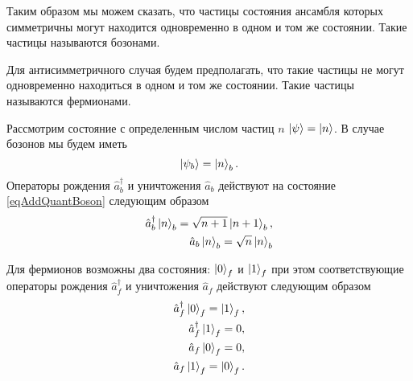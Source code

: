 Таким образом мы можем сказать, что частицы
состояния ансамбля которых симметричны могут находится одновременно в
одном и том же состоянии. Такие частицы называются бозонами.

Для антисимметричного случая будем  
предполагать, что такие частицы не могут одновременно находиться в
одном и том же состоянии. Такие частицы называются фермионами.

Рассмотрим состояние с определенным числом частиц $n$
$\left|\psi\right> = \ket{n}$. В случае бозонов 
мы будем иметь 
\begin{equation}
\left|\psi_b\right> = \ket{n}_b.
\label{eqAddQuantBoson}
\end{equation}
Операторы рождения $\hat{a}_b^{\dag}$ и уничтожения $\hat{a}_b$ действуют на
состояние \eqref{eqAddQuantBoson} следующим образом
\begin{eqnarray}
\hat{a}_b^{\dag}\ket{n}_b = \sqrt{n+1}\ket{n+1}_b, 
\nonumber \\
\hat{a}_b\ket{n}_b = \sqrt{n}\ket{n}_b
\nonumber
\end{eqnarray}

Для фермионов  возможны два состояния: $\ket{0}_f$ и
$\ket{1}_f$ при этом соответствующие операторы рождения
$\hat{a}_f^{\dag}$ и уничтожения $\hat{a}_f$ действуют следующим образом
\begin{eqnarray}
\hat{a}_f^{\dag}\ket{0}_f = \ket{1}_f, 
\nonumber \\
\hat{a}_f^{\dag}\ket{1}_f = 0, 
\nonumber \\
\hat{a}_f\ket{0}_f = 0, 
\nonumber \\
\hat{a}_f\ket{1}_f = \ket{0}_f.
\nonumber
\end{eqnarray}
